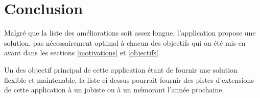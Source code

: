 \section{Conclusion}
Malgré que la liste des améliorations soit assez longue, l'application propose une solution, pas nécessairement optimal à chacun des objectifs qui on été mis en avant dans les sections \ref{motivations} et \ref{objectifs}.

Un des objectif principal de cette application étant de fournir une solution flexible et maintenable, la liste ci-dessus pourrait fournir des pistes d'extensions de cette application à un jobiste ou à un mémorant l'année prochaine.  



